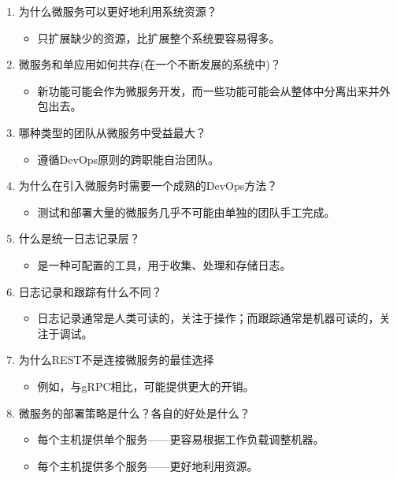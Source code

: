\begin{enumerate}
\item
为什么微服务可以更好地利用系统资源？
\begin{itemize}
\item 
只扩展缺少的资源，比扩展整个系统要容易得多。
\end{itemize}

\item
微服务和单应用如何共存(在一个不断发展的系统中)？
\begin{itemize}
\item 
新功能可能会作为微服务开发，而一些功能可能会从整体中分离出来并外包出去。
\end{itemize}

\item
哪种类型的团队从微服务中受益最大？
\begin{itemize}
\item 
遵循DevOps原则的跨职能自治团队。
\end{itemize}

\item
为什么在引入微服务时需要一个成熟的DevOps方法？
\begin{itemize}
\item 
测试和部署大量的微服务几乎不可能由单独的团队手工完成。
\end{itemize}

\item
什么是统一日志记录层？
\begin{itemize}
\item 
是一种可配置的工具，用于收集、处理和存储日志。
\end{itemize}

\item
日志记录和跟踪有什么不同？
\begin{itemize}
\item 
日志记录通常是人类可读的，关注于操作；而跟踪通常是机器可读的，关注于调试。
\end{itemize}

\item
为什么REST不是连接微服务的最佳选择
\begin{itemize}
\item 
例如，与gRPC相比，可能提供更大的开销。
\end{itemize}

\item
微服务的部署策略是什么？各自的好处是什么？
\begin{itemize}
\item 
每个主机提供单个服务——更容易根据工作负载调整机器。

\item 
每个主机提供多个服务——更好地利用资源。
\end{itemize}
\end{enumerate}
